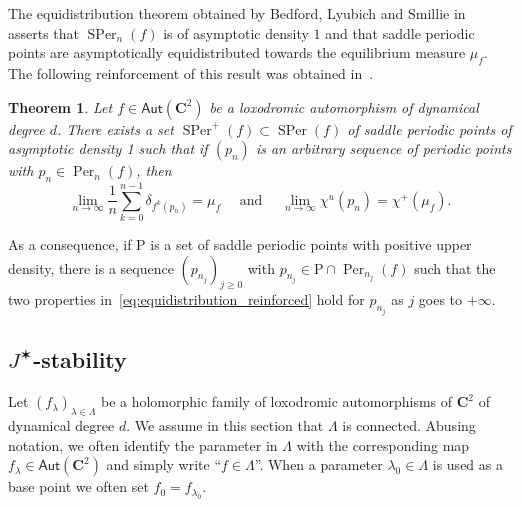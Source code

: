 \documentclass[oneside, 12pt]{amsart}
\newcommand{\unsur}[1]{\frac{1}{#1}}
\newcommand{\lo}{{\lambda_0}}
\newcommand{\jstar}{J^\varstar}
\DeclareMathOperator{\Per}{Per}
\DeclareMathOperator{\SPer}{SPer}
\newcommand{\C}{\mathbf{C}}
\newcommand{\Aut}{\mathsf{Aut}}
\theoremstyle{plain}
\newtheorem{thm}{Theorem}[section]
\theoremstyle{definition}
\numberwithin{equation}{section}       %
\numberwithin{equation}{section}       %
\begin{document}
 The equidistribution theorem obtained by Bedford, Lyubich and Smillie in~\cite{bls2} 
asserts  that $\SPer_n(f)$ is of asymptotic density $1$  and  
that saddle periodic points are asymptotically equidistributed towards the equilibrium measure $\mu_f$. 
The following reinforcement of this result was obtained in~\cite{rigidity}. 
 
 
 \begin{thm}\label{thm:equidistribution_reinforced}
Let $f\in \Aut(\C^2)$ be a loxodromic automorphism of dynamical degree $d$. 
There exists a set $\SPer^+(f)\subset \SPer(f)$ 
 of saddle periodic points   of asymptotic density 1 such that 
 if $(p_n)$ is an arbitrary sequence of periodic points with $p_n\in \Per_n(f)$, then
\begin{equation}\label{eq:equidistribution_reinforced}
\lim_{n\to\infty} \unsur{n}\sum_{k=0}^{n-1}  \delta_{f^k(p_n)}  = \mu_f
\quad \text{ and } \quad 
\lim_{n\to\infty}   \chi^u(p_n) = \chi^+(\mu_f).
\end{equation}
\end{thm}
  
As a consequence, if  $\mathrm{P}$ is a set of saddle periodic points with 
 positive upper density, there is a sequence $(p_{n_j})_{j\geq 0}$ with 
$p_{n_{j}}\in \mathrm{P}\cap \Per_{n_j}(f)$ such that the two properties in~\eqref{eq:equidistribution_reinforced}
 hold for $p_{n_j}$ as $j$ goes to $+\infty$. 

\subsection{$\jstar$-stability}\label{subs:stability}
Let $(f_\lambda)_{\lambda\in \Lambda}$ be a holomorphic family of loxodromic automorphisms of $\C^2$ of dynamical degree $d$.
We assume in this section that $\Lambda$ is connected. 
Abusing notation, we often  identify the parameter in $\Lambda$ with the corresponding map $f_\lambda\in \Aut(\C^2)$ and simply write ``$f\in \Lambda$''. 
When a parameter $\lo\in \Lambda$ is used as a base point we often set $f_0 = f_\lo$.   
\end{document}

